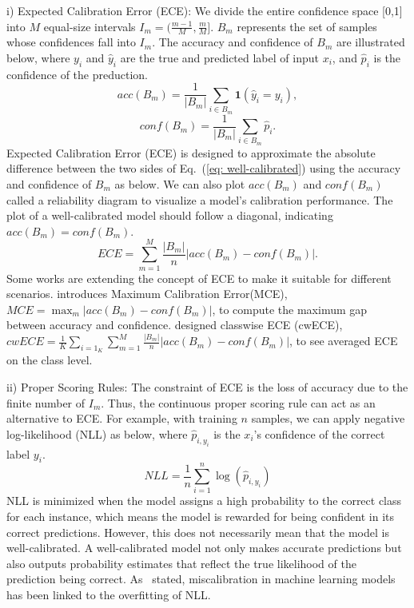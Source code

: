 i) Expected Calibration Error (ECE):
We divide the entire confidence space [0,1] into $M$ equal-size intervals $I_m = (\frac{m-1}{M},\frac{m}{M}]$. $B_m$ represents the set of samples whose confidences fall into $I_m$. The accuracy and confidence of $B_m$ are illustrated below, where $y_i$ and $\hat{y}_i$ are the true and predicted label of input $x_i$, and $\hat{p}_i$ is the confidence of the preduction.
\begin{equation}
    acc(B_m)=\frac{1}{|B_m|}\sum_{i\in B_m}\textbf{1}(\hat{y}_i=y_i),
\end{equation}
\begin{equation}
    conf(B_m)=\frac{1}{|B_m|}\sum_{i\in B_m}\hat{p}_i.
\end{equation}
Expected Calibration Error (ECE) is designed to approximate the absolute difference between the two sides of Eq.~(\ref{eq: well-calibrated}) using the accuracy and confidence of $B_m$ as below. We can also plot $acc(B_m)$ and $conf(B_m)$ called a reliability diagram to visualize a model's calibration performance. The plot of a well-calibrated model should follow a diagonal, indicating $acc(B_m)=conf(B_m)$.
\begin{equation}
    ECE=\sum_{m=1}^M\frac{|B_m|}{n}|acc(B_m)-conf(B_m)|.
\end{equation}
Some works are extending the concept of ECE to make it suitable for different scenarios. \cite{naeini2015obtaining} introduces Maximum Calibration Error(MCE), $MCE=\max_m|acc(B_m)-conf(B_m)|$, to compute the maximum gap between accuracy and confidence. \cite{kull2019beyond} designed classwise ECE (cwECE), $cwECE=\frac{1}{K}\sum_{i=1}_K\sum_{m=1}^M\frac{|B_m|}{n}|acc(B_m)-conf(B_m)|$, to see averaged ECE on the class level.

ii) Proper Scoring Rules: The constraint of ECE is the loss of accuracy due to the finite number of $I_m$. Thus, the continuous proper scoring rule can act as an alternative to ECE. For example, with training $n$ samples, we can apply negative log-likelihood (NLL) as below, where $\hat{p}_{i,y_i}$ is the $x_i$'s confidence of the correct label $y_i$. 
\begin{equation}
    NLL=\frac{1}{n}\sum_{i=1}^n \log(\hat{p}_{i,y_i})
\end{equation}
NLL is minimized when the model assigns a high probability to the correct class for each instance, which means the model is rewarded for being confident in its correct predictions. However, this does not necessarily mean that the model is well-calibrated. A well-calibrated model not only makes accurate predictions but also outputs probability estimates that reflect the true likelihood of the prediction being correct. As~\cite{krishnan2020improving,mukhoti2020calibrating} stated, miscalibration in machine learning models has been linked to the overfitting of NLL.

